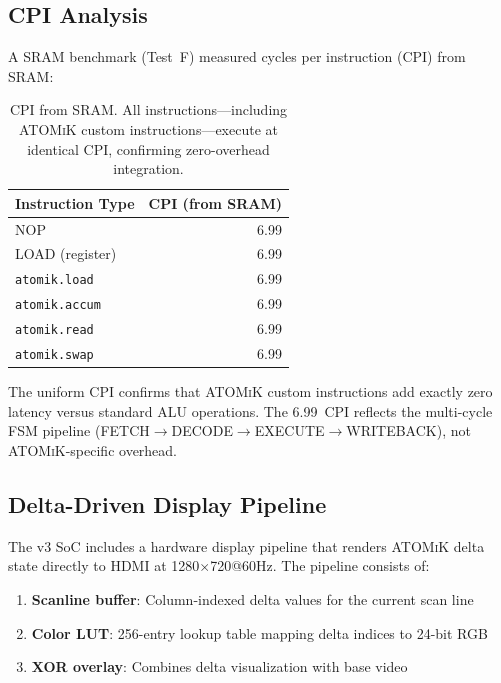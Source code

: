 \documentclass[11pt,letterpaper]{article}
\theoremstyle{plain}
\theoremstyle{definition}
\theoremstyle{remark}
\newcommand{\atomik}{\textsc{ATOMiK}}
\begin{document}
\subsection{CPI Analysis}

A SRAM benchmark (Test~F) measured cycles per instruction (CPI) from SRAM:

\begin{table}[!htbp]
\centering
\caption{CPI from SRAM. All instructions---including \atomik{} custom instructions---execute at identical CPI, confirming zero-overhead integration.}
\label{tab:cpi}
\begin{tabular}{@{}lr@{}}
\toprule
\textbf{Instruction Type} & \textbf{CPI (from SRAM)} \\
\midrule
NOP & 6.99 \\
LOAD (register) & 6.99 \\
\texttt{atomik.load} & 6.99 \\
\texttt{atomik.accum} & 6.99 \\
\texttt{atomik.read} & 6.99 \\
\texttt{atomik.swap} & 6.99 \\
\bottomrule
\end{tabular}
\end{table}

The uniform CPI confirms that \atomik{} custom instructions add exactly zero latency versus standard ALU operations. The 6.99~CPI reflects the multi-cycle FSM pipeline (FETCH$\rightarrow$DECODE$\rightarrow$EXECUTE$\rightarrow$WRITEBACK), not \atomik{}-specific overhead.

\subsection{Delta-Driven Display Pipeline}

The v3 SoC includes a hardware display pipeline that renders \atomik{} delta state directly to HDMI at 1280$\times$720@60Hz. The pipeline consists of:

\begin{enumerate}
    \item \textbf{Scanline buffer}: Column-indexed delta values for the current scan line
    \item \textbf{Color LUT}: 256-entry lookup table mapping delta indices to 24-bit RGB
    \item \textbf{XOR overlay}: Combines delta visualization with base video
\end{enumerate}
\end{document}
